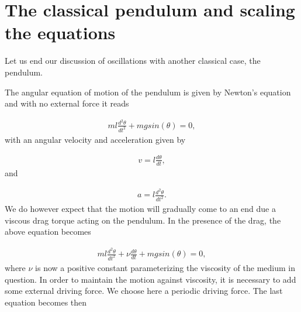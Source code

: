 \documentclass[letterpaper,10pt,english]{sphinxmanual}
\begin{document}
\section{The classical pendulum and scaling the equations}
\label{\detokenize{chapter1:id3}}
Let us end our discussion of oscillations with another classical case, the pendulum.

The angular equation of motion of the pendulum is given by
Newton’s equation and with no external force it reads




\begin{equation*}
\begin{split}
\begin{equation}
  ml\frac{d^2\theta}{dt^2}+mgsin(\theta)=0,
\label{_auto68} \tag{92}
\end{equation}
\end{split}
\end{equation*}
with an angular velocity and acceleration given by




\begin{equation*}
\begin{split}
\begin{equation}
     v=l\frac{d\theta}{dt},
\label{_auto69} \tag{93}
\end{equation}
\end{split}
\end{equation*}
and




\begin{equation*}
\begin{split}
\begin{equation}
     a=l\frac{d^2\theta}{dt^2}.
\label{_auto70} \tag{94}
\end{equation}
\end{split}
\end{equation*}
We do however expect that the motion will gradually come to an end due a viscous drag torque acting on the pendulum.
In the presence of the drag, the above equation becomes




\begin{equation*}
\begin{split}
\begin{equation}
   ml\frac{d^2\theta}{dt^2}+\nu\frac{d\theta}{dt}  +mgsin(\theta)=0, 
\label{_auto71} \tag{95}
\end{equation}
\end{split}
\end{equation*}
where \(\nu\) is now a positive constant parameterizing the viscosity
of the medium in question. In order to maintain the motion against
viscosity, it is necessary to add some external driving force.
We choose here a periodic driving force. The last equation becomes then
\end{document}
